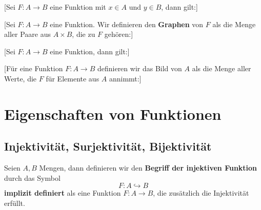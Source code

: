 \documentclass[main.tex]{subfiles}
\begin{document}
[Sei \(F\colon A\to B\) eine Funktion mit \(x\in A\) und \(y\in B\), dann gilt:]
\begin{tabproof}
\end{tabproof}


%
[Sei \(F\colon A\to B\) eine Funktion. Wir definieren den \textbf{Graphen} von \(F\) als die Menge aller Paare aus \(A\times B\), die zu \(F\) gehören:]


[Sei \(F\colon A\to B\) eine Funktion, dann gilt:]

\begin{tabproof}
\end{tabproof}

%
[Für eine Funktion \(F:A\to B\) definieren wir das Bild von \(A\) als die Menge aller Werte, 
die \(F\) für Elemente aus \(A\) annimmt:]

\section{Eigenschaften von Funktionen}
\subsection{Injektivität, Surjektivität, Bijektivität}

\begin{definition}
Seien \(A,B\) Mengen, dann definieren wir den \textbf{Begriff der injektiven Funktion}
durch das Symbol
\[
F\colon A\hookrightarrow B
\]
\textbf{implizit definiert} als eine Funktion \(F\colon A\to B\), die zusätzlich die Injektivität erfüllt.
\end{definition}
\end{document}
